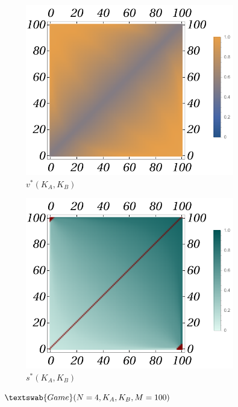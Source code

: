 \documentclass{article}
\theoremstyle{definition}
\newcommand{\G}[1]{$\textswab{Game}(#1)$}
\begin{document}
\begin{figure}[H]
    \centering
    \begin{subfigure}[b]{0.3\textwidth}
        \includegraphics[width=\textwidth]{img/v_Plot_4_100.pdf}
        \caption{$v^*(K_A,K_B)$}
        \label{fig:Game4__100_v}
    \end{subfigure}
    \hspace{0.05\textwidth} %
    \begin{subfigure}[b]{0.3\textwidth}
        \includegraphics[width=\textwidth]{img/s_Plot_4_100.pdf}
        \caption{$s^*(K_A,K_B)$}
        \label{fig:Game4__100_s}
    \end{subfigure}
    \caption{\G{N=4,K_A,K_B,M=100}}
    \label{fig:Game4__100_vs}
\end{figure}
\end{document}
